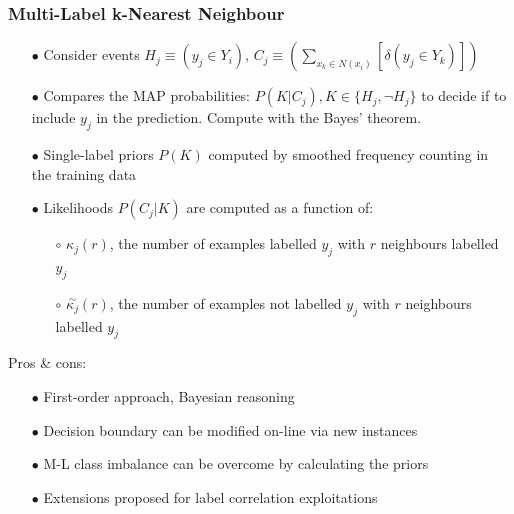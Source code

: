 \documentclass{beamer}
\begin{document}
\begin{frame}
\frametitle{Multi-Label k-Nearest Neighbour}
\begin{itemize}
	\item[$\bullet$] Consider events $H_j \equiv (y_j \in Y_i)$, $C_j \equiv (\sum_{x_k \in N(x_i)} [\delta(y_j \in Y_k)])$
\item[$\bullet$] Compares the MAP probabilities: $P(K|C_j), K \in \{H_j, \neg H_j\}$ to decide if to include $y_j$ in the prediction. Compute with the Bayes' theorem.
\item[$\bullet$] Single-label priors $P(K)$ computed by smoothed frequency counting in the training data
\item[$\bullet$] Likelihoods $P(C_j|K)$ are computed as a function of:
\begin{itemize}
\item[$\circ$] $\kappa_j(r)$, the number of examples labelled $y_j$ with $r$ neighbours labelled $y_j$
\item[$\circ$] $\overset{\sim}{\kappa_j}(r)$, the number of examples not labelled $y_j$ with $r$ neighbours labelled $y_j$
\end{itemize}
\end{itemize}

Pros \& cons:
\begin{itemize}
\item[$\bullet$] First-order approach, Bayesian reasoning
\item[$\bullet$] Decision boundary can be modified on-line via new instances
\item[$\bullet$] M-L class imbalance can be overcome by calculating the priors
\item[$\bullet$] Extensions proposed for label correlation exploitations
\end{itemize}


\end{frame}
\end{document}
